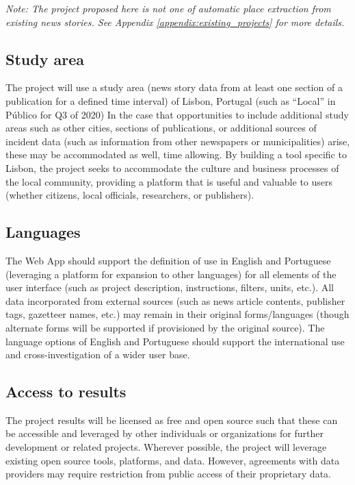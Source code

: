 \textit{Note: The project proposed here is not one of automatic place extraction from existing news stories. See Appendix \ref{appendix:existing_projects} for more details.}


\subsection{Study area}

The project will use a  study area (news story data from at least one section of a publication for a defined time interval) of Lisbon, Portugal (such as “Local” in Público for Q3 of 2020) %
 In the case that opportunities to include additional study areas such as other cities, sections of publications, or additional sources of incident data (such as information from other newspapers or municipalities) arise, these may be accommodated as well, time allowing. By building a tool specific to Lisbon, the project seeks to accommodate the culture and business processes of the local community, providing a platform that is useful and valuable to users (whether citizens, local officials, researchers, or publishers). 

\subsection{Languages}

The Web App should support the definition of use in English and Portuguese (leveraging a platform for expansion to other languages) for all elements of the user interface (such as project description, instructions, filters, units, etc.). All data incorporated from external sources (such as news article contents, publisher tags, gazetteer names, etc.) may remain in their original forms/languages (though alternate forms will be supported if provisioned by the original source). The language options of English and Portuguese should support the international use and cross-investigation of a wider user base.

\subsection{Access to results}

The project results will be licensed as free and open source such that these can be accessible and leveraged by other individuals or organizations for further development or related projects. Wherever possible, the project will leverage existing open source tools, platforms, and data. However, agreements with data providers may require restriction from public access of their proprietary data. 

